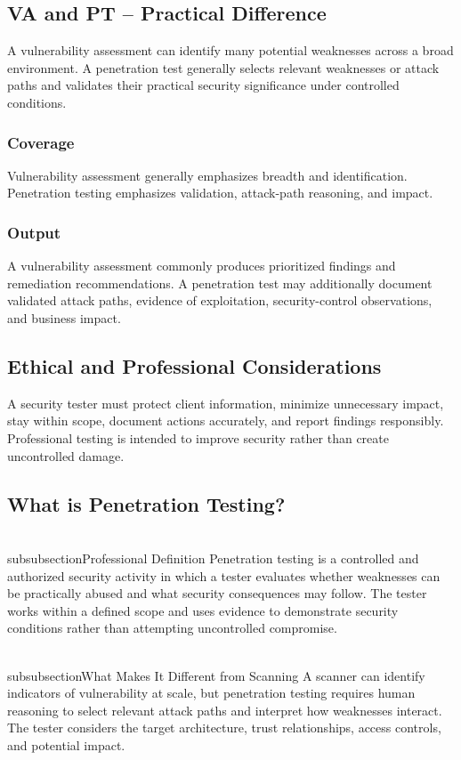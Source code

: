 \documentclass[11pt,a4paper]{article}
\begin{document}
\subsection{VA and PT – Practical Difference}
A vulnerability assessment can identify many potential weaknesses across a broad environment. A penetration test generally selects relevant weaknesses or attack paths and validates their practical security significance under controlled conditions.

\subsubsection{Coverage}
Vulnerability assessment generally emphasizes breadth and identification. Penetration testing emphasizes validation, attack-path reasoning, and impact.

\subsubsection{Output}
A vulnerability assessment commonly produces prioritized findings and remediation recommendations. A penetration test may additionally document validated attack paths, evidence of exploitation, security-control observations, and business impact.

\subsection{Ethical and Professional Considerations}
A security tester must protect client information, minimize unnecessary impact, stay within scope, document actions accurately, and report findings responsibly. Professional testing is intended to improve security rather than create uncontrolled damage.

\subsection{What is Penetration Testing?}
\\subsubsection{Professional Definition}
Penetration testing is a controlled and authorized security activity in which a tester evaluates whether weaknesses can be practically abused and what security consequences may follow. The tester works within a defined scope and uses evidence to demonstrate security conditions rather than attempting uncontrolled compromise.

\\subsubsection{What Makes It Different from Scanning}
A scanner can identify indicators of vulnerability at scale, but penetration testing requires human reasoning to select relevant attack paths and interpret how weaknesses interact. The tester considers the target architecture, trust relationships, access controls, and potential impact.
\end{document}
